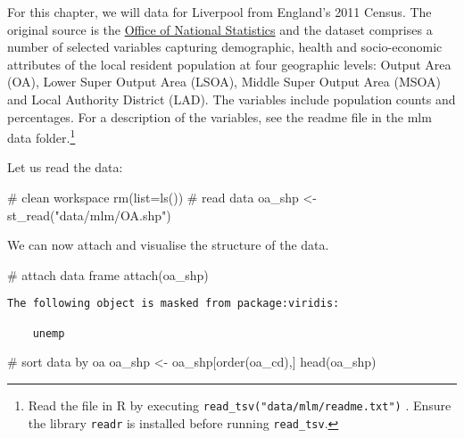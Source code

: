 \documentclass[
  letterpaper,
  krantz2]{style/krantz}
\newenvironment{Shaded}{\begin{snugshade}}{\end{snugshade}}
\newcommand{\AttributeTok}[1]{\textcolor[rgb]{0.40,0.45,0.13}{#1}}
\newcommand{\CommentTok}[1]{\textcolor[rgb]{0.37,0.37,0.37}{#1}}
\newcommand{\FunctionTok}[1]{\textcolor[rgb]{0.28,0.35,0.67}{#1}}
\newcommand{\NormalTok}[1]{\textcolor[rgb]{0.00,0.23,0.31}{#1}}
\newcommand{\OtherTok}[1]{\textcolor[rgb]{0.00,0.23,0.31}{#1}}
\newcommand{\StringTok}[1]{\textcolor[rgb]{0.13,0.47,0.30}{#1}}
\begin{document}
For this chapter, we will data for Liverpool from England's 2011 Census.
The original source is the
\href{https://www.nomisweb.co.uk/home/census2001.asp}{Office of National
Statistics} and the dataset comprises a number of selected variables
capturing demographic, health and socio-economic attributes of the local
resident population at four geographic levels: Output Area (OA), Lower
Super Output Area (LSOA), Middle Super Output Area (MSOA) and Local
Authority District (LAD). The variables include population counts and
percentages. For a description of the variables, see the readme file in
the mlm data folder.\footnote{Read the file in R by executing
  \texttt{read\_tsv("data/mlm/readme.txt")} . Ensure the library
  \texttt{readr} is installed before running \texttt{read\_tsv}.}

Let us read the data:

\begin{Shaded}
\begin{Highlighting}[]
\CommentTok{\# clean workspace}
\FunctionTok{rm}\NormalTok{(}\AttributeTok{list=}\FunctionTok{ls}\NormalTok{())}
\CommentTok{\# read data}
\NormalTok{oa\_shp }\OtherTok{\textless{}{-}} \FunctionTok{st\_read}\NormalTok{(}\StringTok{"data/mlm/OA.shp"}\NormalTok{)}
\end{Highlighting}
\end{Shaded}

We can now attach and visualise the structure of the data.

\begin{Shaded}
\begin{Highlighting}[]
\CommentTok{\# attach data frame}
\FunctionTok{attach}\NormalTok{(oa\_shp)}
\end{Highlighting}
\end{Shaded}

\begin{verbatim}
The following object is masked from package:viridis:

    unemp
\end{verbatim}

\begin{Shaded}
\begin{Highlighting}[]
\CommentTok{\# sort data by oa}
\NormalTok{oa\_shp }\OtherTok{\textless{}{-}}\NormalTok{ oa\_shp[}\FunctionTok{order}\NormalTok{(oa\_cd),]}
\FunctionTok{head}\NormalTok{(oa\_shp)}
\end{Highlighting}
\end{Shaded}
\end{document}
